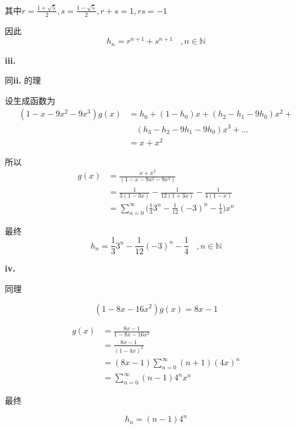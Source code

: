 \documentclass[UTF8]{ctexart}
\begin{document}
    其中$\displaystyle r = \frac{1+\sqrt{5}}{2}, s = \frac{1- \sqrt{5}}{2}, r + s = 1, rs = -1$

    因此$$h_n = r^{n+1} + s^{n+1}~~~~,n\in \mathbb{N} $$

    \textbf{iii. }

    同\textbf{ii. }的理

    设生成函数为
    \begin{equation*}
        \begin{aligned}
            (1-x-9x^2-9x^3)g(x)
            &=h_0+(1-h_0)x+(h_2-h_1-9h_0)x^2+\\
            &~~~~(h_3-h_2-9h_1-9h_0)x^3+\dots\\
            &=x+x^2
        \end{aligned}
    \end{equation*}

    所以
    \begin{equation*}
        \begin{aligned}
            g(x)
            &=\frac{x+x^2}{(1-x-9x^2-9x^3)}\\
            &=\frac{1}{3(1-3x)}-\frac{1}{12(1+3x)}-\frac{1}{4(1-x)}\\
            &=\sum^{\infty}_{n=0}\biggl(\frac{1}{3}3^n-\frac{1}{12}(-3)^n-\frac{1}{4}\biggr)x^n
        \end{aligned}
    \end{equation*}
    
    最终
    $$h_n=\frac{1}{3}3^n-\frac{1}{12}(-3)^n-\frac{1}{4}~~~~,n\in \mathbb{N} $$

    \textbf{iv. }

    同理

    \begin{equation*}
            (1-8x-16x^2)g(x)=8x-1
    \end{equation*}

    \begin{equation*}
        \begin{aligned}
            g(x)
            &=\frac{8x-1}{1-8x-16x^2}\\
            &=\frac{8x-1}{(1-4x)^2}\\
            &=(8x-1)\sum_{n=0}^{\infty}(n+1)(4x)^{n}\\
            &=\sum_{n=0}^{\infty}(n-1)4^nx^n
        \end{aligned}
    \end{equation*}

    最终

    $$h_n=(n-1)4^n$$
\end{document}
